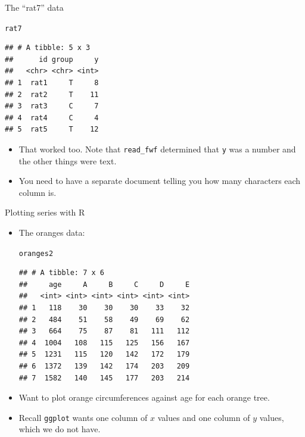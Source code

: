 \documentclass[unknownkeysallowed]{beamer}\usepackage[]{graphicx}\usepackage[]{color}
\makeatletter
\newcommand{\hlstd}[1]{\textcolor[rgb]{0.345,0.345,0.345}{#1}}%
\newenvironment{kframe}{%
 \def\at@end@of@kframe{}%
 \ifinner\ifhmode%
  \def\at@end@of@kframe{\end{minipage}}%
  \begin{minipage}{\columnwidth}%
 \fi\fi%
 \def\FrameCommand##1{\hskip\@totalleftmargin \hskip-\fboxsep
 \colorbox{shadecolor}{##1}\hskip-\fboxsep
     \hskip-\linewidth \hskip-\@totalleftmargin \hskip\columnwidth}%
 \MakeFramed {\advance\hsize-\width
   \@totalleftmargin\z@ \linewidth\hsize
   \@setminipage}}%
 {\par\unskip\endMakeFramed%
 \at@end@of@kframe}
\newenvironment{knitrout}{}{} %
\makeatother
\begin{document}
\begin{frame}[fragile]{The ``rat7'' data}
  
\begin{knitrout}
\color{fgcolor}\begin{kframe}
\begin{alltt}
\hlstd{rat7}
\end{alltt}
\begin{verbatim}
## # A tibble: 5 x 3
##      id group     y
##   <chr> <chr> <int>
## 1  rat1     T     8
## 2  rat2     T    11
## 3  rat3     C     7
## 4  rat4     C     4
## 5  rat5     T    12
\end{verbatim}
\end{kframe}
\end{knitrout}

\begin{itemize}
\item That worked too. Note that \texttt{read\_fwf} determined that
\texttt{y} was a number and the other things were text.
\item You need to have a separate document telling you how many
  characters each column is.
\end{itemize}
  
\end{frame}


\begin{frame}[fragile]{Plotting series with R}

  \begin{itemize}
  \item The oranges data:

\begin{knitrout}
\color{fgcolor}\begin{kframe}
\begin{alltt}
\hlstd{oranges2}
\end{alltt}
\begin{verbatim}
## # A tibble: 7 x 6
##     age     A     B     C     D     E
##   <int> <int> <int> <int> <int> <int>
## 1   118    30    30    30    33    32
## 2   484    51    58    49    69    62
## 3   664    75    87    81   111   112
## 4  1004   108   115   125   156   167
## 5  1231   115   120   142   172   179
## 6  1372   139   142   174   203   209
## 7  1582   140   145   177   203   214
\end{verbatim}
\end{kframe}
\end{knitrout}
\item Want to plot orange circumferences against age for each orange
  tree.
\item Recall \texttt{ggplot} wants one column of $x$ values and one
  column of $y$ values, which we do not have.
  
  \end{itemize}
  
\end{frame}
\end{document}
